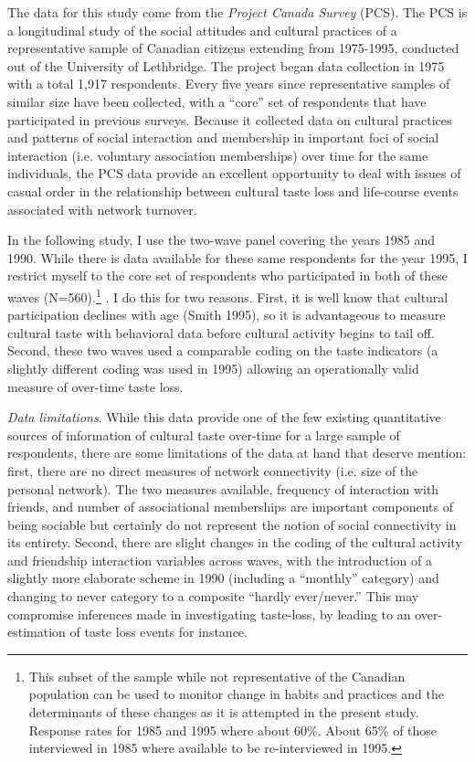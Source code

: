 The data for this study come from the \emph{Project Canada Survey} (PCS). The PCS is a longitudinal study of the social attitudes and cultural practices of a representative sample of Canadian citizens extending from 1975-1995, conducted out of the University of Lethbridge. The project began data collection in 1975 with a total 1,917 respondents. Every five years since representative samples of similar size have been collected, with a ``core'' set of respondents that have participated in previous surveys. Because it collected data on cultural practices and patterns of social interaction and membership in important foci of social interaction (i.e. voluntary association memberships) over time for the same individuals, the PCS data provide an excellent opportunity to deal with issues of casual order in the relationship between cultural taste loss and life-course events associated with network turnover.

In the following study, I use the two-wave panel covering the years 1985 and 1990. While there is data available for these same respondents for the year 1995, I restrict myself to the core set of respondents who participated in both of these waves (N=560).\footnote{This subset of the sample while not representative of the Canadian population can be used to monitor change in habits and practices and the determinants of these changes as it is attempted in the present study. Response rates for 1985 and 1995 where about 60\%. About 65\% of those interviewed in 1985 where available to be re-interviewed in 1995.} . I do this for two reasons. First, it is well know that cultural participation declines with age (Smith 1995), so it is advantageous to measure cultural taste with behavioral data before cultural activity begins to tail off. Second, these two waves used a comparable coding on the taste indicators (a slightly different coding was used in 1995) allowing an operationally valid measure of over-time taste loss.

\emph{Data limitations}. While this data provide one of the few existing quantitative sources of information of cultural taste over-time for a large sample of respondents, there are some limitations of the data at hand that deserve mention: first, there are no direct measures of network connectivity (i.e. size of the personal network). The two measures available, frequency of interaction with friends, and number of associational memberships are important components of being sociable but certainly do not represent the notion of social connectivity in its entirety. Second, there are slight changes in the coding of the cultural activity and friendship interaction variables across waves, with the introduction of a slightly more elaborate scheme in 1990 (including a ``monthly'' category) and changing to never category to a composite ``hardly ever/never.'' This may compromise inferences made in investigating taste-loss, by leading to an over-estimation of taste loss events for instance.

